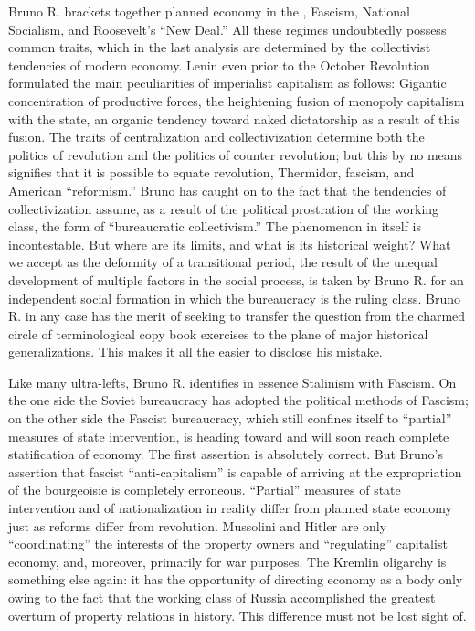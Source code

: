 Bruno R. brackets together planned economy in the \USSR, Fascism, National Socialism, and Roosevelt’s “New Deal.” All these regimes undoubtedly possess common traits, which in the last analysis are determined by the collectivist tendencies of modern economy. Lenin even prior to the October Revolution formulated the main peculiarities of imperialist capitalism as follows: Gigantic concentration of productive forces, the heightening fusion of monopoly capitalism with the state, an organic tendency toward naked dictatorship as a result of this fusion. The traits of centralization and collectivization determine both the politics of revolution and the politics of counter revolution; but this by no means signifies that it is possible to equate revolution, Thermidor, fascism, and American “reformism.” Bruno has caught on to the fact that the tendencies of collectivization assume, as a result of the political prostration of the working class, the form of “bureaucratic collectivism.” The phenomenon in itself is incontestable. But where are its limits, and what is its historical weight? What we accept as the deformity of a transitional period, the result of the unequal development of multiple factors in the social process, is taken by Bruno R. for an independent social formation in which the bureaucracy is the ruling class. Bruno R. in any case has the merit of seeking to transfer the question from the charmed circle of terminological copy book exercises to the plane of major historical generalizations. This makes it all the easier to disclose his mistake.

Like many ultra-lefts, Bruno R. identifies in essence Stalinism with Fascism. On the one side the Soviet bureaucracy has adopted the political methods of Fascism; on the other side the Fascist bureaucracy, which still confines itself to “partial” measures of state intervention, is heading toward and will soon reach complete statification of economy. The first assertion is absolutely correct. But Bruno’s assertion that fascist “anti-capitalism” is capable of arriving at the expropriation of the bourgeoisie is completely erroneous. “Partial” measures of state intervention and of nationalization in reality differ from planned state economy just as reforms differ from revolution. Mussolini and Hitler are only “coordinating” the interests of the property owners and “regulating” capitalist economy, and, moreover, primarily for war purposes. The Kremlin oligarchy is something else again: it has the opportunity of directing economy as a body only owing to the fact that the working class of Russia accomplished the greatest overturn of property relations in history. This difference must not be lost sight of.

